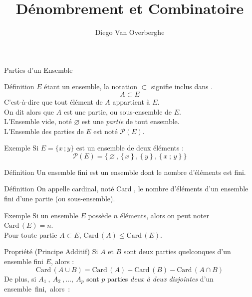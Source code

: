 \documentclass{cours}
\title{Dénombrement et Combinatoire}
\author{Diego Van Overberghe}
\begin{document}

    \begin{Gpartie}{Parties d'un Ensemble}
        \begin{Spartie}{Définition}
            $E$ étant un ensemble, la notation $\subset$ signifie \og inclus dans \fg{}.
            \[A\subset E\]
            C'est-à-dire que tout élément de $A$ appartient à $E$. \\
            On dit alors que $A$ est une partie, ou sous-ensemble de $E$. \\
            L'Ensemble vide, noté $\varnothing$ est une \emph{partie} de tout ensemble. \\
            L'Ensemble des parties de $E$ est noté $\mathcal{P}(E)$.
            \begin{SSpartie}{Exemple}
                Si $E=\big\{x\,;y\big\}$ est un ensemble de deux éléments :
                \[\mathcal{P}(E)=\Big\{\,\varnothing~,\,\big\{\,x~\big\}~,\,\big\{\,y~\big\}~,\,\big\{\,x~;\,y~\big\}~\Big\}\]
            \end{SSpartie}
        \end{Spartie}
        \begin{Spartie}{Définition}
            Un ensemble fini est un ensemble dont le nombre d'éléments est fini.
        \end{Spartie}
        \begin{Spartie}{Définition}
            On appelle cardinal, noté \og Card \fg{}, le nombre d'éléments d'un ensemble fini d'une partie (ou sous-ensemble).
            \begin{SSpartie}{Exemple}
                Si un ensemble $E$ possède $n$ éléments, alors on peut noter $\mathrm{Card}\,(E)=n$. \\
                Pour toute partie $A\subset E$, $\mathrm{Card}\,(A)\leq\mathrm{Card}\,(E)$.
            \end{SSpartie}
        \end{Spartie}
        \begin{Spartie}{Propriété (Principe Additif)}
            Si $A$ et $B$ sont deux parties quelconques d'un ensemble fini $E$, alors :
            \[\mathrm{Card}\,(A\cup B)=\mathrm{Card}\,(A)+\mathrm{Card}\,(B)-\mathrm{Card}\,(A\cap B)\]
            De plus, si $A_1~,~A_2~,\dotsc,~A_p$ sont $p$ parties \emph{deux à deux disjointes} d'un ensemble~fini,~alors~:

\end{Spartie}
\end{Gpartie}
\end{document}
